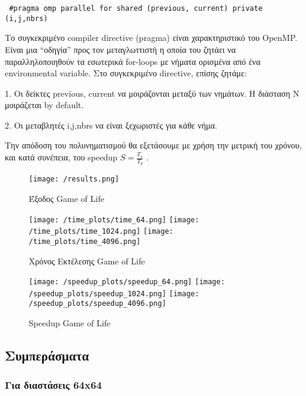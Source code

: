 \documentclass[../final_report.tex]{subfiles}
\begin{document}
\begin{lstlisting}
 #pragma omp parallel for shared (previous, current) private (i,j,nbrs)
\end{lstlisting}


Το συγκεκριμένο compiler directive (pragma) είναι χαρακτηριστικό του OpenMP. Είναι μια “οδηγία” προς τον μεταγλωττιστή η οποία του ζητάει να παραλληλοποιηθούν τα εσωτερικά for-loops με νήματα ορισμένα από ένα environmental variable. Στο συγκεκριμένο directive, επίσης ζητάμε:

1.	Οι δείκτες previous, current να μοιράζονται μεταξύ των νημάτων. Η διάσταση Ν μοιράζεται by default.

2.	Οι μεταβλητές i,j,nbrs να είναι ξεχωριστές για κάθε νήμα.
\newline

Την απόδοση του πολυνηματισμού θα εξετάσουμε με χρήση την μετρική του χρόνου, και κατά συνέπεια, του speedup $S=\frac{T_s}{T_p}$ . \newline

\begin{figure}[H]
    \centering
    \texttt{[image: /results.png]}
    \caption{Έξοδος Game of Life}
    \label{fig:Έξοδος Game Of Life}
\end{figure}

\begin{figure}[H]
    \centering
    \texttt{[image: /time\_plots/time\_64.png]}
    \texttt{[image: /time\_plots/time\_1024.png]}
    \texttt{[image: /time\_plots/time\_4096.png]}
    \caption{Χρόνος Εκτέλεσης Game of Life}
    \label{fig:Χρόνος Εκτέλεσης Game Of Life}
\end{figure}

\begin{figure}[H]
    \centering
    \texttt{[image: /speedup\_plots/speedup\_64.png]}
    \texttt{[image: /speedup\_plots/speedup\_1024.png]}
    \texttt{[image: /speedup\_plots/speedup\_4096.png]}
    \caption{Speedup Game of Life}
    \label{fig:Speedup Game Of Life}
\end{figure}

\subsection*{Συμπεράσματα}
\subsubsection*{Για διαστάσεις 64x64}
\end{document}

